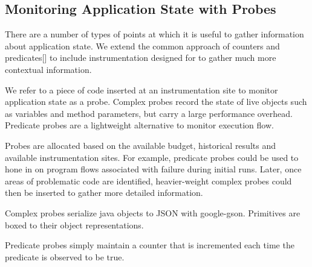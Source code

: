 \subsection{Monitoring Application State with Probes}

There are a number of types of points at which it is useful to gather information about application state. We extend the common approach of counters and predicates[] to include instrumentation designed for to gather much more contextual information.

We refer to a piece of code inserted at an instrumentation site to monitor application state as a probe. Complex probes record the state of live objects such as variables and method parameters, but carry a large performance overhead. Predicate probes are a lightweight alternative to monitor execution flow.

Probes are allocated based on the available budget, historical results and available instrumentation sites. For example, predicate probes could be used to hone in on program flows associated with failure during initial runs. Later, once areas of problematic code are identified, heavier-weight complex probes could then be inserted to gather more detailed information.


Complex probes serialize java objects to JSON with google-gson. Primitives are boxed to their object representations.

Predicate probes simply maintain a counter that is incremented each time the predicate is observed to be true.

